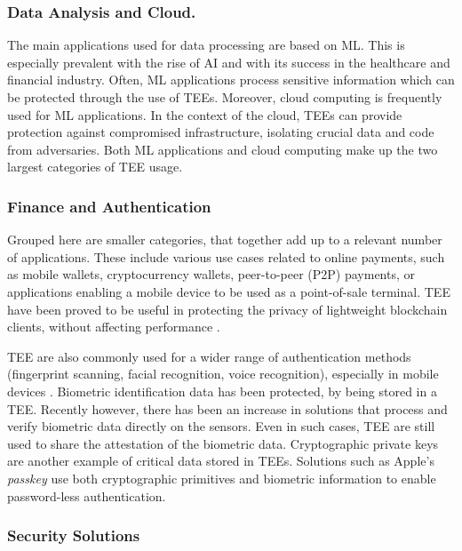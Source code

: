 \documentclass[runningheads,a4paper]{uwsese}
\begin{document}
\subsubsection{Data Analysis and Cloud.} 

The main applications used for data processing are based on \gls{ML}. This is
especially prevalent with the rise of AI and with its success in the healthcare
and financial industry. Often, \gls{ML} applications process sensitive
information which can be protected through the use of \glspl{TEE}. Moreover,
cloud computing is frequently used for \gls{ML} applications. In the context of
the cloud, \glspl{TEE} can provide protection against compromised
infrastructure, isolating crucial data and code from adversaries. Both \gls{ML}
applications and cloud computing make up the two largest categories of
\gls{TEE} usage.

\subsubsection{Finance and Authentication}

Grouped here are smaller categories, that together add up to a relevant number
of applications. These include various use cases related to online payments,
such as mobile wallets, cryptocurrency wallets, peer-to-peer (P2P) payments, or
applications enabling a mobile device to be used as a point-of-sale terminal.
\gls{TEE} have been proved to be useful in protecting the privacy of
lightweight blockchain clients, without affecting performance
\cite{light_blockchain}.

\gls{TEE} are also commonly used for a wider range of authentication methods
(fingerprint scanning, facial recognition, voice recognition), especially in
mobile devices \cite{tee_in_android}. Biometric identification data has been
protected, by being stored in a \gls{TEE}. Recently however, there has been an
increase in solutions that process and verify biometric data directly on the
sensors. Even in such cases, \gls{TEE} are still used to share the attestation of
the biometric data. Cryptographic private keys are another example of critical
data stored in \glspl{TEE}. Solutions such as Apple's \emph{passkey}
\cite{apple_passkey} use both cryptographic primitives and biometric
information to enable password-less authentication.

\subsubsection{Security Solutions}
\end{document}
